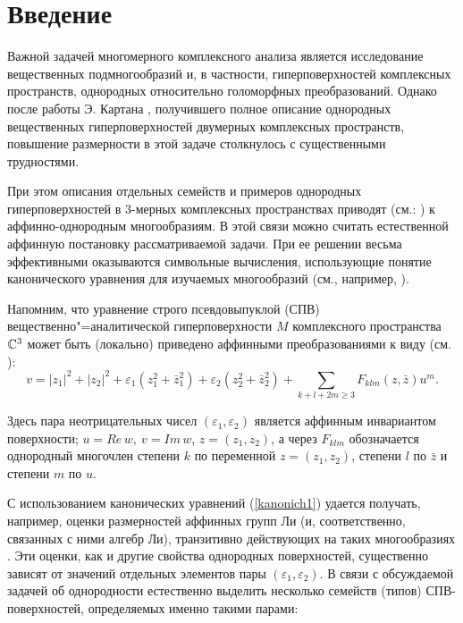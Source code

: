 
\section*{Введение}

  Важной задачей многомерного комплексного анализа является исследование
вещественных подмногообразий и, в частности, гиперповерхностей комплексных
пространств, однородных относительно
голоморфных преобразований. Однако после работы Э. Картана \cite{CartanHom}, получившего
полное описание
однородных вещественных гиперповерхностей двумерных комплексных пространств,
повышение размерности в этой задаче столкнулось с существенными трудностями.

  При этом описания отдельных семейств и примеров однородных гиперповерхностей
в 3-мерных
комплексных пространствах приводят (см.: \cite{Loboda03, FelsKaup, Beloshapka})
к аффинно-однородным многообразиям. В этой связи
можно считать естественной аффинную постановку рассматриваемой задачи.
При ее решении весьма эффективными оказываются символьные вычисления, использующие
понятие канонического
уравнения для изучаемых многообразий (см., например, \cite{EastwoodEzhov, LobodaKhod}).

Напомним, что уравнение
строго псевдовыпуклой (СПВ)
вещественно"=аналитической гиперповерхности $ M $ комплексного пространства
$ \Bbb C^3 $ может быть (локально) приведено аффинными преобразованиями к
виду (см. \cite{LobodaKhod}):
\begin{equation}
   v = |z_1|^2 + |z_2|^2 + \varepsilon_1 (z_1^2 + \bar z_1^2) +
   \varepsilon_2 (z_2^2 + \bar z_2^2) +\sum_{k+l+2m \ge 3} F_{klm} (z,\bar z) u^m.\label{kanonich1}
\end{equation}


  Здесь пара
неотрицательных чисел
$ (\varepsilon_1, \varepsilon_2) $ является аффинным инвариантом поверхности;
$u = Re\,w, \ v = Im\,w $, $ z=(z_1,z_2)$, а через $ F_{klm} $ обозначается однородный многочлен степени
$ k $ по переменной $ z=(z_1,z_2) $, степени $ l $ по $ \bar z $ и степени $ m $ по $ u $.

  С использованием канонических уравнений (\ref{kanonich1}) удается получать, например,
оценки размерностей аффинных групп Ли (и, соответственно,
связанных с ними алгебр Ли), транзитивно действующих на таких многообразиях
\cite{Loboda01}.
  Эти оценки, как и другие свойства
одно\-родных поверхностей, существенно
зависят от значений отдельных элементов пары
$ (\varepsilon_1, \varepsilon_2) $. В связи с обсуждаемой задачей об
однородности естественно выделить несколько
семейств (типов) СПВ-поверхностей, определяемых именно такими парами:

